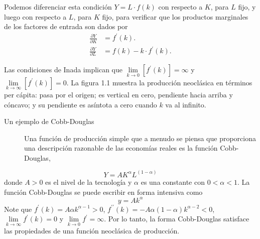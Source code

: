 Podemos diferenciar esta condición $Y=L\cdot f\left(k\right)$ con respecto a $K$, para $L$ fijo, y luego con respecto a $L$, para $K$ fijo, para verificar que los productos marginales de los factores de entrada son dados por
\begin{align}
\frac{\partial Y}{\partial K}&=f^{\prime}\left(k\right).\\
\frac{\partial Y}{\partial L}&=f\left(k\right)-k\cdot f^{\prime}\left(k\right).
\end{align}

Las condiciones de Inada implican que $\lim\limits_{k\to0}\left[f^{\prime}\left(k\right)\right]=\infty$ y $\lim\limits_{k\to\infty}\left[f^{\prime}\left(k\right)\right]=0$. La figura 1.1 muestra la producción neoclásica en términos per cápita: pasa por el origen; es vertical en cero, pendiente hacia arriba y cóncavo; y su pendiente es asíntota a cero cuando $k$ va al infinito.
\begin{description}
\item[Un ejemplo de Cobb-Douglas] Una función de producción simple que a menudo se piensa que proporciona una descripción razonable de las economías reales es la función Cobb-Douglas,
\end{description}
\begin{equation}
Y=AK^{\alpha}L^{\left(1-\alpha\right)}
\end{equation}
donde $A>0$ es el nivel de la tecnología y $\alpha$ es una constante con $0<\alpha<1$. La función Cobb-Douglas se puede escribir en forma intensiva como
\begin{equation}
y=Ak^{\alpha}
\end{equation}
Note que $f^{\prime}\left(k\right)=A\alpha k^{\alpha-1}>0$, $f^{\prime\prime}\left(k\right)=-A\alpha\left(1-\alpha\right)k^{\alpha-2}<0$, $\lim\limits_{k\to\infty}f^{\prime}\left(k\right)=0$ y $\lim\limits_{k\to0}f^{\prime}=\infty$. Por lo tanto, la forma Cobb-Douglas satisface las propiedades de una función neoclásica de producción.


